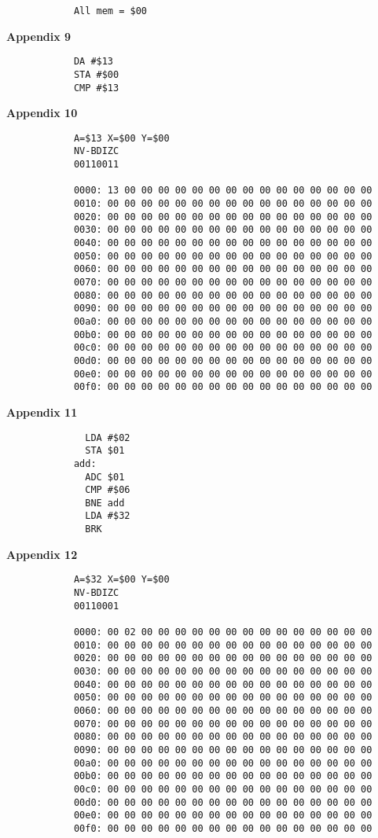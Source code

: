 \documentclass[12pt]{article}
\begin{document}
\begin{appendices}
\begin{verbatim}
			All mem = $00
		\end{verbatim}
	\textbf{Appendix 9}
		\begin{verbatim}
			DA #$13
			STA #$00
			CMP #$13
		\end{verbatim}
	\textbf{Appendix 10}
		\begin{verbatim}
			A=$13 X=$00 Y=$00
			NV-BDIZC
			00110011

			0000: 13 00 00 00 00 00 00 00 00 00 00 00 00 00 00 00 
			0010: 00 00 00 00 00 00 00 00 00 00 00 00 00 00 00 00 
			0020: 00 00 00 00 00 00 00 00 00 00 00 00 00 00 00 00 
			0030: 00 00 00 00 00 00 00 00 00 00 00 00 00 00 00 00 
			0040: 00 00 00 00 00 00 00 00 00 00 00 00 00 00 00 00 
			0050: 00 00 00 00 00 00 00 00 00 00 00 00 00 00 00 00 
			0060: 00 00 00 00 00 00 00 00 00 00 00 00 00 00 00 00 
			0070: 00 00 00 00 00 00 00 00 00 00 00 00 00 00 00 00 
			0080: 00 00 00 00 00 00 00 00 00 00 00 00 00 00 00 00 
			0090: 00 00 00 00 00 00 00 00 00 00 00 00 00 00 00 00 
			00a0: 00 00 00 00 00 00 00 00 00 00 00 00 00 00 00 00 
			00b0: 00 00 00 00 00 00 00 00 00 00 00 00 00 00 00 00 
			00c0: 00 00 00 00 00 00 00 00 00 00 00 00 00 00 00 00 
			00d0: 00 00 00 00 00 00 00 00 00 00 00 00 00 00 00 00 
			00e0: 00 00 00 00 00 00 00 00 00 00 00 00 00 00 00 00 
			00f0: 00 00 00 00 00 00 00 00 00 00 00 00 00 00 00 00
		\end{verbatim}
	\textbf{Appendix 11}
		\begin{verbatim}
			  LDA #$02
			  STA $01 
			add:
			  ADC $01 
			  CMP #$06
			  BNE add
			  LDA #$32
			  BRK
		\end{verbatim}
	\textbf{Appendix 12}
		\begin{verbatim}
			A=$32 X=$00 Y=$00
			NV-BDIZC
			00110001

			0000: 00 02 00 00 00 00 00 00 00 00 00 00 00 00 00 00 
			0010: 00 00 00 00 00 00 00 00 00 00 00 00 00 00 00 00 
			0020: 00 00 00 00 00 00 00 00 00 00 00 00 00 00 00 00 
			0030: 00 00 00 00 00 00 00 00 00 00 00 00 00 00 00 00 
			0040: 00 00 00 00 00 00 00 00 00 00 00 00 00 00 00 00 
			0050: 00 00 00 00 00 00 00 00 00 00 00 00 00 00 00 00 
			0060: 00 00 00 00 00 00 00 00 00 00 00 00 00 00 00 00 
			0070: 00 00 00 00 00 00 00 00 00 00 00 00 00 00 00 00 
			0080: 00 00 00 00 00 00 00 00 00 00 00 00 00 00 00 00 
			0090: 00 00 00 00 00 00 00 00 00 00 00 00 00 00 00 00 
			00a0: 00 00 00 00 00 00 00 00 00 00 00 00 00 00 00 00 
			00b0: 00 00 00 00 00 00 00 00 00 00 00 00 00 00 00 00 
			00c0: 00 00 00 00 00 00 00 00 00 00 00 00 00 00 00 00 
			00d0: 00 00 00 00 00 00 00 00 00 00 00 00 00 00 00 00 
			00e0: 00 00 00 00 00 00 00 00 00 00 00 00 00 00 00 00 
			00f0: 00 00 00 00 00 00 00 00 00 00 00 00 00 00 00 00
		\end{verbatim}
\end{appendices}

\clearpage
{}
\begin{versionhistory}
\end{versionhistory}
\end{document}

